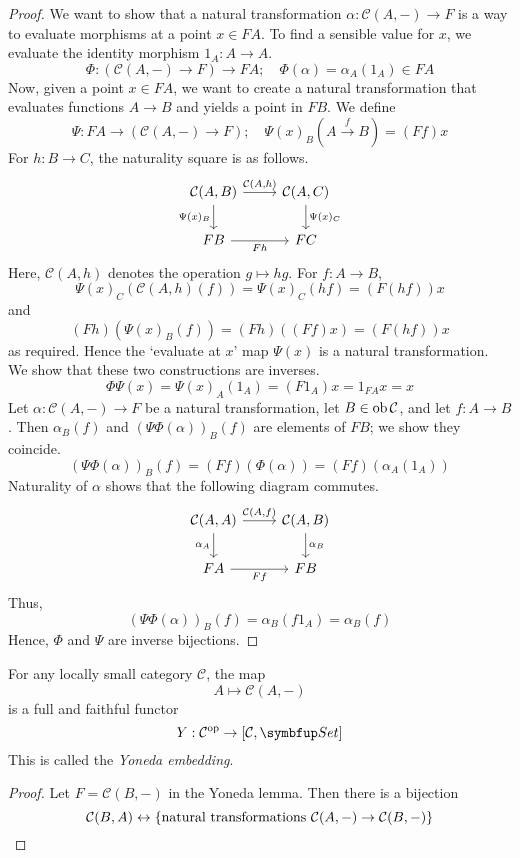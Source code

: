\begin{proof}
    We want to show that a natural transformation \( \alpha : \mathcal C(A, -) \to F \) is a way to evaluate morphisms at a point \( x \in F A \).
    To find a sensible value for \( x \), we evaluate the identity morphism \( 1_A : A \to A \).
    \[ \Phi : (\mathcal C(A, -) \to F) \to F A;\quad \Phi(\alpha) = \alpha_A(1_A) \in F A \]
    Now, given a point \( x \in F A \), we want to create a natural transformation that evaluates functions \( A \to B \) and yields a point in \( F B \).
    We define
    \[ \Psi : F A \to (\mathcal C(A, -) \to F);\quad \Psi(x)_B(A \xrightarrow f B) = (F f)x \]
    For \( h : B \to C \), the naturality square is as follows.
    \[\begin{tikzcd}
        {\mathcal C(A, B)} & {\mathcal C(A, C)} \\
        FB & FC
        \arrow["{\mathcal C(A, h)}", from=1-1, to=1-2]
        \arrow["{\Psi(x)_C}", from=1-2, to=2-2]
        \arrow["{\Psi(x)_B}"', from=1-1, to=2-1]
        \arrow["Fh"', from=2-1, to=2-2]
    \end{tikzcd}\]
    Here, \( \mathcal C(A, h) \) denotes the operation \( g \mapsto hg \).
    For \( f : A \to B \),
    \[ \Psi(x)_C(\mathcal C(A, h)(f)) = \Psi(x)_C (hf) = (F (hf))x \]
    and
    \[ (Fh)(\Psi(x)_B(f)) = (Fh)((Ff)x) = (F (hf))x \]
    as required.
    Hence the `evaluate at \( x \)' map \( \Psi(x) \) is a natural transformation.
    We show that these two constructions are inverses.
    \[ \Phi \Psi(x) = \Psi(x)_A (1_A) = (F 1_A) x = 1_{F A} x = x \]
    Let \( \alpha : \mathcal C(A, -) \to F \) be a natural transformation, let \( B \in \operatorname{ob} \mathcal C \), and let \( f : A \to B \).
    Then \( \alpha_B(f) \) and \( (\Psi \Phi(\alpha))_B (f) \) are elements of \( F B \); we show they coincide.
    \[ (\Psi \Phi(\alpha))_B (f) = (F f) (\Phi(\alpha)) = (F f) (\alpha_A (1_A)) \]
    Naturality of \( \alpha \) shows that the following diagram commutes.
    \[\begin{tikzcd}
        {\mathcal C(A, A)} & {\mathcal C(A, B)} \\
        FA & FB
        \arrow["{\mathcal C(A, f)}", from=1-1, to=1-2]
        \arrow["{\alpha_B}", from=1-2, to=2-2]
        \arrow["{\alpha_A}"', from=1-1, to=2-1]
        \arrow["Ff"', from=2-1, to=2-2]
    \end{tikzcd}\]
    Thus,
    \[ (\Psi \Phi(\alpha))_B (f) = \alpha_B (f 1_A) = \alpha_B (f) \]
    Hence, \( \Phi \) and \( \Psi \) are inverse bijections.
\end{proof}
\begin{corollary}
    For any locally small category \( \mathcal C \), the map
    \[ A \mapsto \mathcal C(A, -) \]
    is a full and faithful functor
    \[ Y : \mathcal C^\cop \to [\mathcal C, \mathbf{Set}] \]
    This is called the \emph{Yoneda embedding}.
\end{corollary}
\begin{proof}
    Let \( F = \mathcal C(B, -) \) in the Yoneda lemma.
    Then there is a bijection
    \[ \mathcal C(B, A) \leftrightarrow \qty{\text{natural transformations } \mathcal C(A, -) \to \mathcal C(B, -)} \]
\end{proof}
